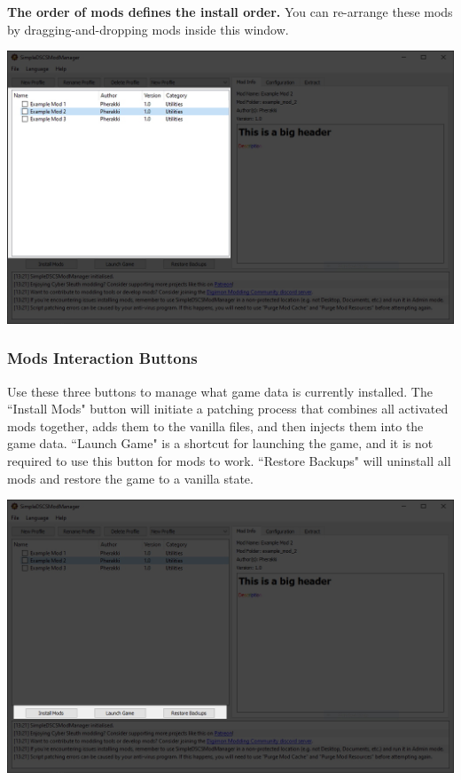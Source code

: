 \documentclass{article}
\begin{document}
\textbf{The order of mods defines the install order.} You can re-arrange these mods by dragging-and-dropping mods inside this window.
\begin{center}
  \includegraphics[scale=0.4]{img/modmanager_ui_modslist.jpg}
\end{center}
\newpage
\subsubsection{Mods Interaction Buttons}
Use these three buttons to manage what game data is currently installed. The ``Install Mods" button will initiate a patching process that combines all activated mods together, adds them to the vanilla files, and then injects them into the game data. ``Launch Game" is a shortcut for launching the game, and it is not required to use this button for mods to work. ``Restore Backups" will uninstall all mods and restore the game to a vanilla state.
\begin{center}
  \includegraphics[scale=0.4]{img/modmanager_ui_modinteractionbuttons.jpg}
\end{center}
\end{document}
